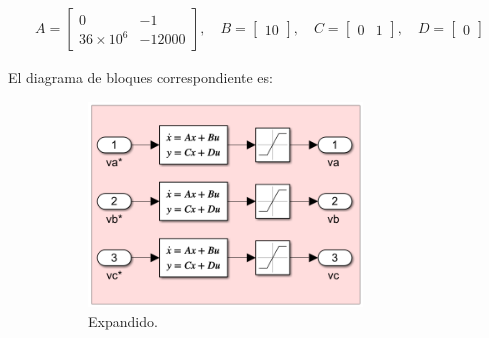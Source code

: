 \documentclass{article}
\begin{document}
    \begin{align*}
    A = \begin{bmatrix}
    0 & -1 \\
    36 \times 10^6 & -12000
    \end{bmatrix}, \quad
    B = \begin{bmatrix}
    10
    \end{bmatrix}, \quad
    C = \begin{bmatrix}
    0 & 1
    \end{bmatrix}, \quad
    D = \begin{bmatrix}
    0
    \end{bmatrix}
\end{align*}

El diagrama de bloques correspondiente es:

\begin{figure}[H]
    \begin{subfigure}[b]{0.75\textwidth}
        \centering
        \includegraphics[width=0.8\textwidth]{5.2.5.e.1.png}
        \caption{Expandido.}
    \end{subfigure}
    \begin{subfigure}[b]{0.24\textwidth}
        \centering

\end{subfigure}
\end{figure}
\end{document}
